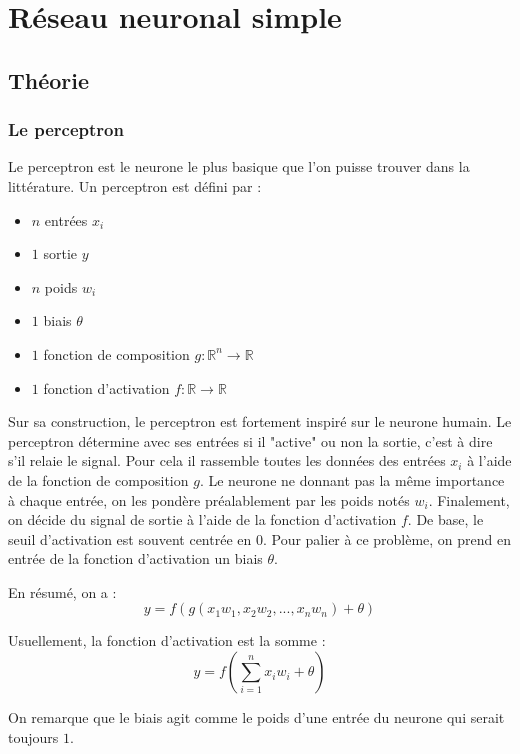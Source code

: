 \chapter{Réseau neuronal simple}

\section{Théorie}

\subsection{Le perceptron}

Le perceptron est le neurone le plus basique que l'on puisse trouver dans la littérature. Un perceptron est défini par :
\begin{itemize}
\item $n$ entrées $x_i$
\item $1$ sortie $y$
\item $n$ poids $w_i$
\item $1$ biais $\theta$
\item $1$ fonction de composition $g : \mathbb{R}^n \to \mathbb{R}$
\item $1$ fonction d'activation $f : \mathbb{R} \to \mathbb{R}$
\end{itemize}

\vspace{\parskip}
Sur sa construction, le perceptron est fortement inspiré sur le neurone humain.
Le perceptron détermine avec ses entrées si il "active" ou non la sortie, c'est
à dire s'il relaie le signal. Pour cela il rassemble toutes les données des
entrées $x_i$ à l'aide de la fonction de composition $g$. Le neurone ne donnant
pas la même importance à chaque entrée, on les pondère préalablement par les
poids notés $w_i$. Finalement, on décide du signal de sortie à l'aide de la
fonction d'activation $f$. De base, le seuil d'activation est souvent centrée
en $0$. Pour palier à ce problème, on prend en entrée de la fonction
d'activation un biais $\theta$.

\medskip

En résumé, on a :
\[y = f(g(x_1w_1, x_2w_2, ... , x_nw_n) + \theta) \]

\medskip

Usuellement, la fonction d'activation est la somme :
\[y = f(\sum_{i=1}^n x_iw_i + \theta) \]

\medskip

On remarque que le biais agit comme le poids d'une entrée du neurone qui serait
toujours $1$.


